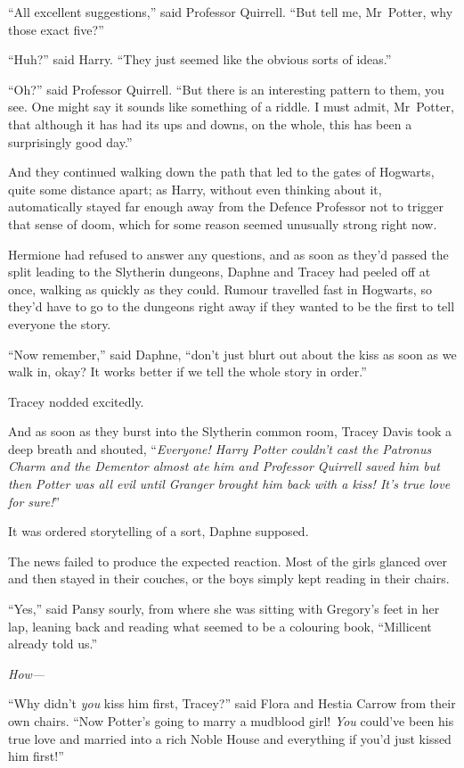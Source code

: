 “All excellent suggestions,” said Professor Quirrell. “But tell me, Mr~Potter, why those exact five?”

“Huh?” said Harry. “They just seemed like the obvious sorts of ideas.”

“Oh?” said Professor Quirrell. “But there is an interesting pattern to them, you see. One might say it sounds like something of a riddle. I must admit, Mr~Potter, that although it has had its ups and downs, on the whole, this has been a surprisingly good day.”

And they continued walking down the path that led to the gates of Hogwarts, quite some distance apart; as Harry, without even thinking about it, automatically stayed far enough away from the Defence Professor not to trigger that sense of doom, which for some reason seemed unusually strong right now.


Hermione had refused to answer any questions, and as soon as they’d passed the split leading to the Slytherin dungeons, Daphne and Tracey had peeled off at once, walking as quickly as they could. Rumour travelled fast in Hogwarts, so they’d have to go to the dungeons right away if they wanted to be the first to tell everyone the story.

“Now remember,” said Daphne, “don’t just blurt out about the kiss as soon as we walk in, okay? It works better if we tell the whole story in order.”

Tracey nodded excitedly.

And as soon as they burst into the Slytherin common room, Tracey Davis took a deep breath and shouted, “\emph{Everyone! Harry Potter couldn’t cast the Patronus Charm and the Dementor almost ate him and Professor Quirrell saved him but then Potter was all evil until Granger brought him back with a kiss! It’s true love for sure!}”

It was ordered storytelling of a sort, Daphne supposed.

The news failed to produce the expected reaction. Most of the girls glanced over and then stayed in their couches, or the boys simply kept reading in their chairs.

“Yes,” said Pansy sourly, from where she was sitting with Gregory’s feet in her lap, leaning back and reading what seemed to be a colouring book, “Millicent already told us.”

\emph{How—}

“Why didn’t \emph{you} kiss him first, Tracey?” said Flora and Hestia Carrow from their own chairs. “Now Potter’s going to marry a mudblood girl! \emph{You} could’ve been his true love and married into a rich Noble House and everything if you’d just kissed him first!”


